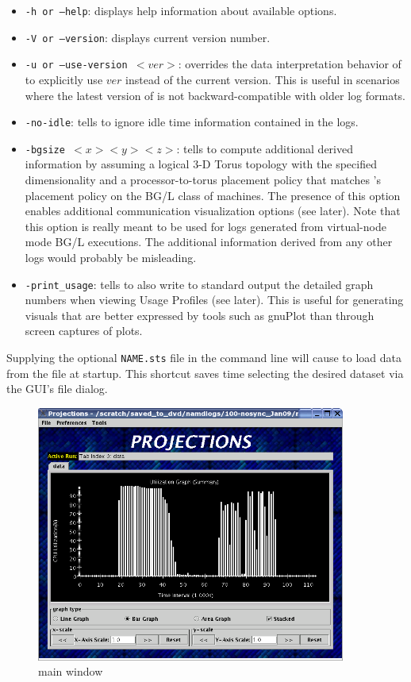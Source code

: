 \documentclass[10pt]{article}
\begin{document}
\begin{itemize}
\item
{\tt -h or --help}: displays help information about available options.
\item
{\tt -V or --version}: displays current \projections{} version number.
\item
{\tt -u or --use-version $<ver>$}: overrides the data interpretation
behavior of \projections{} to explicitly use $ver$ instead of the
current version. This is useful in scenarios where the latest version
of \projections{} is not backward-compatible with older log formats.
\item
{\tt -no-idle}: tells \projections{} to ignore idle time information
contained in the logs.
\item
{\tt -bgsize $<x> <y> <z>$}: tells \projections{} to compute
additional derived information by assuming a logical 3-D Torus
topology with the specified dimensionality and a processor-to-torus
placement policy that matches \charmpp's placement policy on the BG/L
class of machines. The presence of this option enables additional
communication visualization options (see later). Note that this option
is really meant to be used for logs generated from virtual-node mode
BG/L executions. The additional information derived from any other
logs would probably be misleading.
\item
{\tt -print\_usage}: tells \projections{} to also write to standard
output the detailed graph numbers when viewing Usage Profiles (see
later). This is useful for generating visuals that are better
expressed by tools such as gnuPlot than through screen captures of
\projections{} plots.
\end{itemize}

Supplying the optional {\tt NAME.sts} file in the command line will
cause \projections{} to load data from the file at startup. This shortcut
saves time selecting the desired dataset via the GUI's file dialog.

\begin{figure}[hbt]
\center
\includegraphics[width=4.0in]{fig/front-with-summary}
\caption{\projections{} main window}
\label{mainwindow}
\end{figure}
\end{document}

